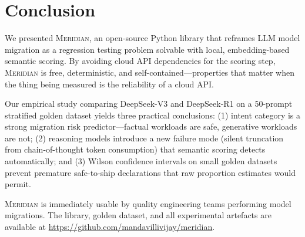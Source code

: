 \documentclass[11pt,a4paper]{article}
\begin{document}
\section{Conclusion}

We presented \textsc{Meridian}, an open-source Python library that reframes LLM
model migration as a regression testing problem solvable with local, embedding-based
semantic scoring.
By avoiding cloud API dependencies for the scoring step, \textsc{Meridian} is
free, deterministic, and self-contained---properties that matter when the thing
being measured is the reliability of a cloud API.

Our empirical study comparing DeepSeek-V3 and DeepSeek-R1 on a 50-prompt
stratified golden dataset yields three practical conclusions:
(1) intent category is a strong migration risk predictor---factual workloads
are safe, generative workloads are not;
(2) reasoning models introduce a new failure mode (silent truncation from
chain-of-thought token consumption) that semantic scoring detects automatically;
and (3) Wilson confidence intervals on small golden datasets prevent premature
safe-to-ship declarations that raw proportion estimates would permit.

\textsc{Meridian} is immediately usable by quality engineering teams performing
model migrations.
The library, golden dataset, and all experimental artefacts are available at
\url{https://github.com/mandavillivijay/meridian}.



\end{document}
